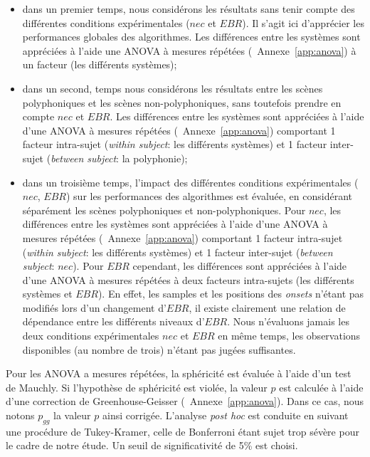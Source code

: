 \begin{itemize}
\item dans un premier temps, nous considérons les résultats sans tenir compte des différentes conditions expérimentales ($nec$ et $EBR$). Il s'agit ici d'apprécier les performances globales des algorithmes. Les différences entre les systèmes sont appréciées à l'aide une ANOVA à mesures répétées (\cf~Annexe~\ref{app:anova}) à un facteur (les différents systèmes);
\item dans un second, temps nous considérons les résultats entre les scènes polyphoniques et les scènes non-polyphoniques, sans toutefois prendre en compte $nec$ et $EBR$. Les différences entre les systèmes sont appréciées à l'aide d'une ANOVA à mesures répétées (\cf~Annexe~\ref{app:anova}) comportant 1 facteur intra-sujet (\emph{within subject}: les différents systèmes) et 1 facteur inter-sujet (\emph{between subject}: la polyphonie); 
\item dans un troisième temps, l'impact des différentes conditions expérimentales ($nec$, $EBR$) sur les performances des algorithmes est évaluée, en considérant séparément les scènes polyphoniques et non-polyphoniques. Pour $nec$, les différences entre les systèmes sont appréciées à l'aide d'une ANOVA à mesures répétées (\cf~Annexe~\ref{app:anova}) comportant 1 facteur intra-sujet (\emph{within subject}: les différents systèmes) et 1 facteur inter-sujet (\emph{between subject}: $nec$). Pour $EBR$ cependant, les différences sont appréciées à l'aide d'une ANOVA à mesures répétées à deux facteurs intra-sujets (les différents systèmes et $EBR$). En effet, les samples et les positions des \emph{onsets} n'étant pas modifiés lors d'un changement d'$EBR$, il existe clairement une relation de dépendance entre les différents niveaux d'$EBR$. Nous n'évaluons jamais les deux conditions expérimentales $nec$ et $EBR$ en même temps, les observations disponibles (au nombre de trois) n'étant pas jugées suffisantes.
\end{itemize}

Pour les ANOVA a mesures répétées, la sphéricité est évaluée à l'aide d'un test de Mauchly. Si l'hypothèse de sphéricité est violée, la valeur $p$ est calculée à l'aide d'une correction de Greenhouse-Geisser (\cf~Annexe~\ref{app:anova}). Dans ce cas, nous notons $p_{gg}$ la valeur $p$ ainsi corrigée. L'analyse \emph{post hoc} est conduite en suivant une procédure de Tukey-Kramer, celle de Bonferroni étant sujet trop sévère pour le cadre de notre étude. Un seuil de significativité de 5\% est choisi.

